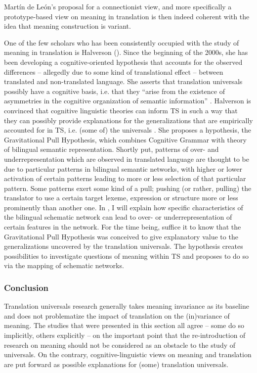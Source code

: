 Martín de León's proposal for a connectionist view, and more specifically a prototype-based view on meaning in translation is then indeed coherent with the idea that meaning construction is variant.\largerpage

One of the few scholars who has been consistently occupied with the study of meaning in translation is Halverson (\citeyear{halverson_cognitive_2003, shreve_cognitive_2010, rojo_implications_2013,de_sutter_developing_2017}). Since the beginning of the 2000s, she has been developing a cognitive-oriented hypothesis that accounts for the observed differences – allegedly due to some kind of translational effect –  between translated and non-translated language. She asserts that translation universals possibly have a cognitive basis, i.e. that they “arise from the existence of asymmetries in the cognitive organization of semantic information” \citep[197]{halverson_cognitive_2003}. Halverson is convinced that cognitive linguistic theories can inform TS in such a way that they can possibly provide explanations for the generalizations that are empirically accounted for in TS, i.e. (some of) the universals \citep[230]{halverson_cognitive_2003}. She proposes a hypothesis, the Gravitational Pull Hypothesis, which combines  Cognitive Grammar with   theory of bilingual semantic representation. Shortly put, patterns of over- and underrepresentation which are observed in translated language are thought to be due to particular patterns in bilingual semantic networks, with higher or lower activation of certain patterns leading to more or less selection of that particular pattern. Some patterns exert some kind of a pull; pushing (or rather, pulling) the translator to use a certain target lexeme, expression or structure more or less prominently than another one. In , I will explain how specific characteristics of the bilingual schematic network can lead to over- or underrepresentation of certain features in the network. For the time being, suffice it to know that the Gravitational Pull Hypothesis was conceived to give explanatory value to the generalizations uncovered by the translation universals. The hypothesis creates possibilities to investigate questions of meaning within TS and proposes to do so via the mapping of schematic networks. 

\subsubsection{Conclusion}\label{sec:2.2.3.3}\largerpage
Translation universals research generally takes meaning invariance as its baseline and does not problematize the impact of translation on the (in)variance of meaning. The studies that were presented in this section all agree – some do so implicitly, others explicitly – on the important point that the re-introduction of research on meaning should not be considered as an obstacle to the study of universals. On the contrary, cognitive-linguistic views on meaning and translation are put forward as possible explanations for (some) translation universals. 

